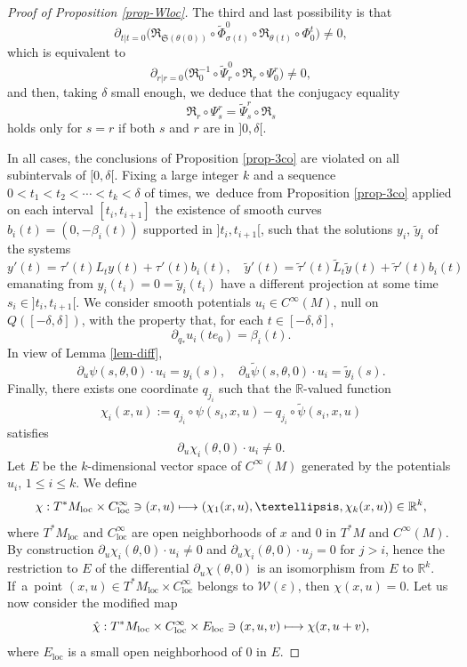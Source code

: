 \documentclass[11pt]{article}
\newcommand\mto{\mathchoice{\longmapsto}{\mapsto}{\mapsto}{\mapsto}}
\newcommand{\loc}{\mathrm{loc}}
\let\epsilon\varepsilon
\newcommand{\Rm}{\mathbb{R}}
\newcommand{\gR}{\ensuremath{\mathfrak{R}}}
\newcommand{\gS}{\ensuremath{\mathfrak{S}}}
\newcommand{\mW}{\ensuremath{\mathcal{W}}}
\theoremstyle{plain}
\theoremstyle{definition}
\begin{document}
\begin{proof}[Proof of Proposition \ref{prop-Wloc}]
The third and last possibility is that
\[
\partial_{t|t=0} \big(\gR_{\gS(\theta(0))}\circ\tilde \Phi_{\sigma(t)}^0\circ\gR_{\theta(t)}\circ \Phi_0^t\big) \neq 0,
\]
which is equivalent to
\[
\partial_{r|r=0} \big(\gR_0^{-1}\circ \tilde \Psi_r^0\circ\gR_{r}\circ \Psi_0^r\big) \neq 0,
\]
and then, taking $\delta$ small enough, we deduce that the
conjugacy equality
\[
\gR_{r}\circ \Psi_s^r= \tilde \Psi_s^r\circ \gR_{s}
\]
holds only for $s= r$ if both $s$ and $r$ are in $]0, \delta[$.

In all cases, the conclusions of Proposition \ref{prop-3co} are violated on all subintervals of $[0, \delta[$.
Fixing a large integer $k$ and a sequence $0<t_1< t_2 < \cdots <t_k<\delta$ of times, we~deduce from
Proposition \ref{prop-3co} applied on each interval $[t_i, t_{i+1}]$ the existence of smooth curves
$b_i(t)=(0, -\beta_i(t))$ supported in
$]t_i, t_{i+1}[$, such that the solutions $y_i$, $\tilde y_i$ of the systems
\[
y'(t)=\tau'(t)L_ty(t)+\tau'(t)b_i(t), \quad
\tilde y'(t)=\tilde \tau '(t)\tilde L_t\tilde y(t)+\tilde \tau'(t) b_i(t)
\]
emanating from $y_i(t_i)\!=\!0\!=\!\tilde y_i(t_i)$ have a different projection at some time $s_i\!\in\!{}]t_i, t_{i+1}[$.
We consider smooth potentials $u_i\in C^{\infty}(M)$, null on $Q([-\delta, \delta])$, with the property that,
for each $t\in [-\delta, \delta]$,
\[
\partial_{q_*} u_i(te_0)=\beta_i(t).
\]
In view of Lemma \ref{lem-diff},
\[
\partial_u \psi (s,\theta,0)\cdot u_i = y_i(s),\quad
\partial_u \tilde \psi (s,\theta,0)\cdot u_i = \tilde y_i(s).
\]
Finally, there exists one coordinate $q_{j_i}$ such that the $\Rm$-valued function
\[
\chi_i(x,u):=q_{j_i}\circ\psi(s_i,x,u)-q_{j_i}\circ \tilde \psi(s_i,x,u)
\]
satisfies
\[
\partial_u \chi_i(\theta,0)\cdot u_i \neq 0.
\]
Let $E$ be the $k$-dimensional vector space of $C^{\infty}(M)$ generated by the potentials $u_i$, $1\leq i \leq k$. We define
\[
\chi: T^*M_{\loc}\times C^{\infty}_{\loc}\ni(x,u)\mto (\chi_1(x,u), \ldots, \chi_k(x,u))\in \Rm^k,
\]
where $T^*M_{\loc}$ and $ C^{\infty}_{\loc}$ are open neighborhoods of $x$ and $0$ in $T^*M$ and $C^{\infty}(M)$.
By construction
$
\partial_u \chi_i(\theta,0)\cdot u_i \neq 0$
and
$
\partial_u \chi_i(\theta,0)\cdot u_j = 0$ for $j >i$, hence
the restriction to $E$ of the differential $\partial_u\chi (\theta,0)$ is an isomorphism from $E$ to $\Rm^k$.
If~a~point $(x,u)\in T^*M_{\loc}\times C^{\infty}_{\loc}$ belongs to $\mW(\epsilon)$, then $\chi(x,u)=0$.
Let us now consider the modified map
\[
\hat \chi:T^*M_{\loc}\times C^{\infty}_{\loc}\times E_{\loc} \ni (x,u,v)\mto \chi(x,u+v),
\]
where $E_{\loc}$ is a small open neighborhood of $0$ in $E$.

\end{proof}
\end{document}
